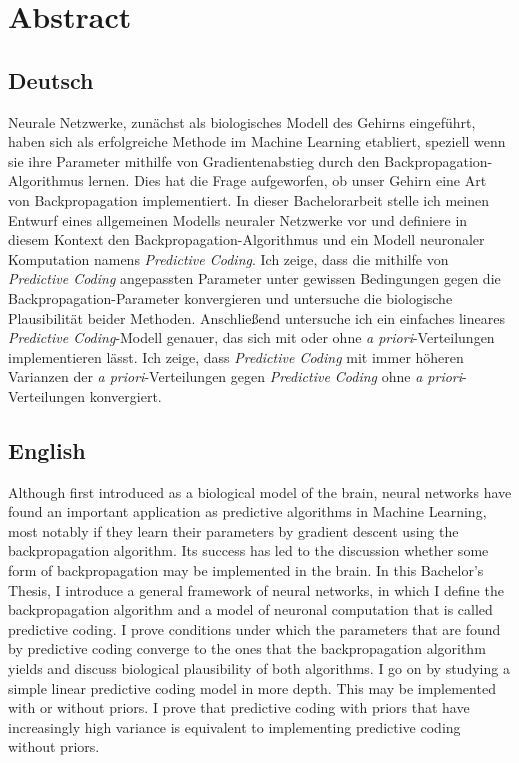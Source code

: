 \documentclass[a4paper,11pt]{report}
\begin{document}

\chapter*{Abstract}

\section*{Deutsch}
Neurale Netzwerke, zunächst als biologisches Modell des Gehirns eingeführt, haben sich als erfolgreiche Methode im Machine Learning etabliert, speziell wenn sie ihre Parameter mithilfe von Gradientenabstieg durch den Backpropagation-Algorithmus lernen. Dies hat die Frage aufgeworfen, ob unser Gehirn eine Art von Backpropagation implementiert. In dieser Bachelorarbeit stelle ich meinen Entwurf eines allgemeinen Modells neuraler Netzwerke vor und definiere in diesem Kontext den Backpropagation-Algorithmus und ein Modell neuronaler Komputation namens \textit{Predictive Coding}. Ich zeige, dass die mithilfe von \textit{Predictive Coding} angepassten Parameter unter gewissen Bedingungen gegen die Backpropagation-Parameter konvergieren und untersuche die biologische Plausibilität beider Methoden. Anschließend untersuche ich ein einfaches lineares \textit{Predictive Coding}-Modell genauer, das sich mit oder ohne \textit{a priori}-Verteilungen implementieren lässt. Ich zeige, dass \textit{Predictive Coding} mit immer höheren Varianzen der \textit{a priori}-Verteilungen gegen \textit{Predictive Coding} ohne \textit{a priori}-Verteilungen konvergiert.

\section*{English}
Although first introduced as a biological model of the brain, neural networks have found an important application as predictive algorithms in Machine Learning, most notably if they learn their parameters by gradient descent using the backpropagation algorithm. Its success has led to the discussion whether some form of backpropagation may be implemented in the brain. In this Bachelor's Thesis, I introduce a general framework of neural networks, in which I define the backpropagation algorithm and a model of neuronal computation that is called predictive coding. I prove conditions under which the parameters that are found by predictive coding converge to the ones that the backpropagation algorithm yields and discuss biological plausibility of both algorithms. I go on by studying a simple linear predictive coding model in more depth. This may be implemented with or without priors. I prove that predictive coding with priors that have increasingly high variance is equivalent to implementing predictive coding without priors.
\end{document}
